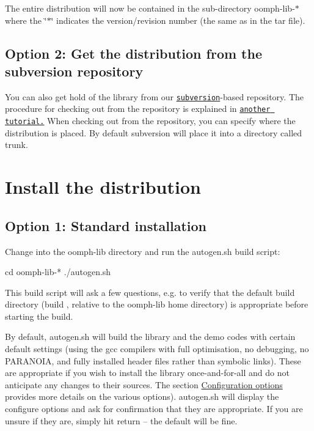 The entire distribution will now be contained in the sub-\/directory {\ttfamily oomph-\/lib-\/$\ast$} where the \char`\"{}$\ast$\char`\"{} indicates the version/revision number (the same as in the tar file).\hypertarget{index_subversion}{}\subsection{Option 2\+: Get the distribution from the subversion repository}\label{index_subversion}
You can also get hold of the library from our \href{http://www.subversion.tigris.org}{\tt subversion}-\/based repository. The procedure for checking out from the repository is explained in \href{../../subversion/html/index.html}{\tt another tutorial.} When checking out from the repository, you can specify where the distribution is placed. By default subversion will place it into a directory called {\ttfamily trunk}.



\hypertarget{index_install}{}\section{Install the distribution}\label{index_install}
\hypertarget{index_standard_install}{}\subsection{Option 1\+: Standard installation}\label{index_standard_install}
Change into the {\ttfamily oomph-\/lib} directory and run the {\ttfamily autogen.\+sh} build script\+:


\begin{DoxyCode}
cd oomph-lib-*
./autogen.sh
\end{DoxyCode}


This build script will ask a few questions, e.\+g. to verify that the default build directory ({\ttfamily build }, relative to the oomph-\/lib home directory) is appropriate before starting the build.

By default, {\ttfamily autogen}.{\ttfamily sh} will build the library and the demo codes with certain default settings (using the gcc compilers with full optimisation, no debugging, no P\+A\+R\+A\+N\+O\+IA, and fully installed header files rather than symbolic links). These are appropriate if you wish to install the library once-\/and-\/for-\/all and do not anticipate any changes to their sources. The section \hyperlink{index_custom_install}{Configuration options} provides more details on the various options). {\ttfamily autogen.\+sh} will display the configure options and ask for confirmation that they are appropriate. If you are unsure if they are, simply hit return -- the default will be fine.

